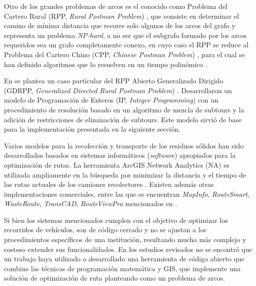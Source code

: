 \documentclass[conference]{IEEEtran}
\begin{document}
Otro de los grandes problemas de arcos es el conocido como Problema del Cartero Rural (RPP, \textit{Rural Postman Problem}) \cite{YordaPerez2014ElChino}, que consiste en determinar el camino de mínima distancia que recorre solo algunos de los arcos del grafo y representa un problema \textit{NP-hard}, a no ser que el subgrafo formado por los arcos requeridos sea un grafo completamente conexo, en cuyo caso el RPP se reduce al Problema del Cartero Chino (CPP, \textit{Chinese Postman Problem}) \cite{YordaPerez2014ElChino}, para el cual se han definido algoritmos que lo resuelven en un tiempo polinómico \cite{CalvinoM2011CooperacionPanoramica}.

En \cite{Braier2017AnArgentina} se plantea un caso particular del RPP Abierto Generalizado Dirigido (GDRPP, \textit{Generalized Directed Rural Postman Problem}) \cite{Avila2015AProblem}. Desarrollaron un modelo de Programación de Enteros (IP, \textit{Integer Programming}) \cite{Conforti2014IntegerProgramming} con un procedimiento de resolución basado en un algoritmo de mezcla de subtours y la adición de restricciones de eliminación de subtours. Este modelo sirvió de base para la implementación presentada en la siguiente sección.

Varios modelos para la recolección y transporte de los residuos sólidos han sido desarrollados basados en sistemas informáticos (\textit{software}) apropiados para la optimización de rutas. La herramienta ArcGIS Network Analytics (NA) es utilizada ampliamente en la búsqueda por minimizar la distancia y el tiempo de las rutas actuales de los camiones recolectores \cite{Kallel2016UsingTunisia} \cite{Malakahmad2014SolidMalaysia}. Existen además otras implementaciones comerciales, entre las que se encuentran \textit{MapInfo}, \textit{RouteSmart}, \textit{WasteRoute}, \textit{TransCAD}, \textit{RouteViewPro} mencionados en \cite{Kallel2016UsingTunisia}.

Si bien los sistemas mencionados cumplen con el objetivo de optimizar los recorridos de vehículos, son de código cerrado y no se ajustan a los procedimientos específicos de una institución, resultando mucho más complejo y costoso extender sus funcionalidades. En los estudios revisados no se encontró que un trabajo haya utilizado o desarrollado una herramienta de código abierto que combine las técnicas de programación matemática y GIS, que implemente una solución de optimización de ruta planteando como un problema de arcos. 
\end{document}
